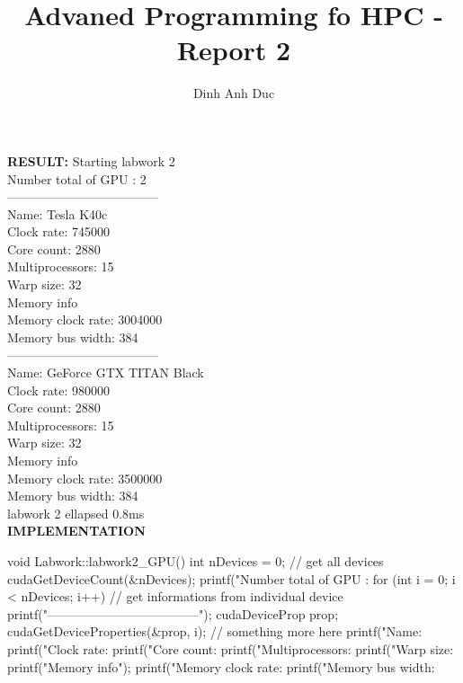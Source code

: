 \documentclass[10pt, a4paper]{article}
\title{Advaned Programming fo HPC - Report 2}
\author{Dinh Anh Duc}
\begin{document}
\maketitle

\textbf{RESULT:}
Starting labwork 2
\\
Number total of GPU : 2
\\
------------------------------------
\\
Name: Tesla K40c
\\
Clock rate: 745000
\\
Core count: 2880
\\
Multiprocessors: 15
\\
Warp size: 32
\\
Memory info
\\
Memory clock rate: 3004000
\\
Memory bus width: 384
\\
------------------------------------
\\
Name: GeForce GTX TITAN Black
\\
Clock rate: 980000
\\
Core count: 2880
\\
Multiprocessors: 15
\\
Warp size: 32
\\
Memory info
\\
Memory clock rate: 3500000
\\
Memory bus width: 384
\\
labwork 2 ellapsed 0.8ms
\\
\textbf{IMPLEMENTATION}
\begin{listings}
void Labwork::labwork2_GPU() {
    int nDevices = 0;
    // get all devices
    cudaGetDeviceCount(&nDevices);
    printf("Number total of GPU : %
    for (int i = 0; i < nDevices; i++){
        // get informations from individual device
        printf("------------------------------------\n");
        cudaDeviceProp prop;
        cudaGetDeviceProperties(&prop, i);
        // something more here
        printf("Name: %
        printf("Clock rate: %
        printf("Core count: %
        printf("Multiprocessors: %
        printf("Warp size: %
        printf("Memory info\n");
        printf("Memory clock rate: %
        printf("Memory bus width: %
    }
}
\end{listings}
\end{document}
